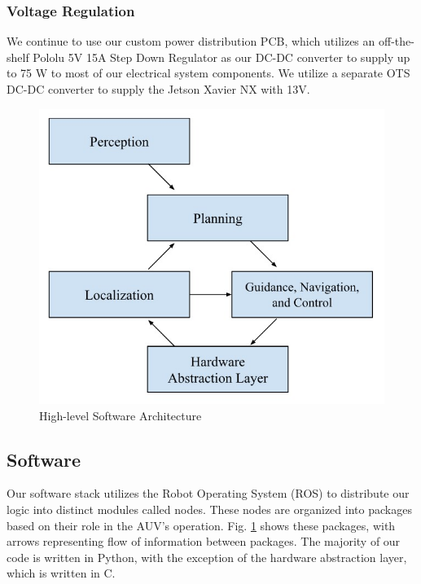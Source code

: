 \documentclass[conference]{IEEEtran}
\begin{document}
\subsubsection{Voltage Regulation}
\label{sssec:voltage_regulation}
We continue to use our custom power distribution PCB, which utilizes an off-the-shelf Pololu 5V 15A Step Down Regulator as our DC-DC converter to supply up to 75 W to most of our electrical system components. We utilize a separate OTS DC-DC converter to supply the Jetson Xavier NX with 13V.

\begin{figure}[htbp]
    \centerline{\includegraphics[scale=0.47]{images/ros_diagram.jpg}}
    \caption{High-level Software Architecture}
    \label{fig:ros}
\end{figure}
\subsection{Software}
\label{ssec:software}

Our software stack utilizes the Robot Operating System (ROS) to distribute our logic into distinct modules called nodes. These nodes are organized into packages based on their role in the AUV's operation. Fig. \ref{fig:ros} shows these packages, with arrows representing flow of information between packages. The majority of our code is written in Python, with the exception of the hardware abstraction layer, which is written in C. 
\end{document}
